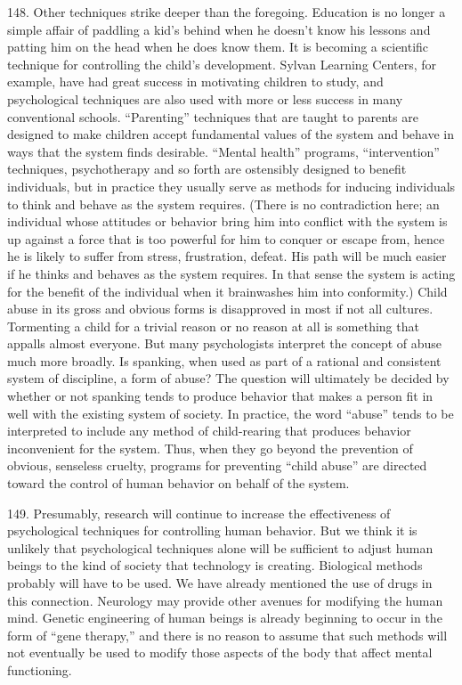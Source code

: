 \documentclass{article}
\begin{document}
148. Other techniques strike deeper than the foregoing. Education is no longer a simple affair of 
paddling a kid’s behind when he doesn’t know his lessons and patting him on the head when he 
does know them. It is becoming a scientific technique for controlling the child’s 
development. Sylvan Learning Centers, for example, have had great success in motivating 
children to study, and psychological techniques are also used with more or less success in many 
conventional schools. “Parenting” techniques that are taught to parents are designed to make 
children accept fundamental values of the system and behave in ways that the system finds 
desirable. “Mental health” programs, “intervention” techniques, psychotherapy and so forth are 
ostensibly designed to benefit individuals, but in practice they usually serve as methods for 
inducing individuals to think and behave as the system requires. (There is no contradiction here; 
an individual whose attitudes or behavior bring him into conflict with the system is up against a 
force that is too powerful for him to conquer or escape from, hence he is likely to suffer from 
stress, frustration, defeat. His path will be much easier if he thinks and behaves as the system 
requires. In that sense the system is acting for the benefit of the individual when it brainwashes 
him into conformity.) Child abuse in its gross and obvious forms is disapproved in most if not all 
cultures. Tormenting a child for a trivial reason or no reason at all is something that appalls almost 
everyone. But many psychologists interpret the concept of abuse much more broadly. Is spanking, 
when used as part of a rational and consistent system of discipline, a form of abuse? The question 
will ultimately be decided by whether or not spanking tends to produce behavior that makes a 
person fit in well with the existing system of society. In practice, the word “abuse” tends to be 
interpreted to include any method of child-rearing that produces behavior inconvenient for the 
system. Thus, when they go beyond the prevention of obvious, senseless cruelty, programs for 
preventing “child abuse” are directed toward the control of human behavior on behalf of the 
system. \vspace{\baselineskip}
 
149. Presumably, research will continue to increase the effectiveness of psychological techniques 
for controlling human behavior. But we think it is unlikely that psychological techniques alone 
will be sufficient to adjust human beings to the kind of society that technology is 
creating. Biological methods probably will have to be used. We have already mentioned the use 
of drugs in this connection. Neurology may provide other avenues for modifying the human 
mind. Genetic engineering of human beings is already beginning to occur in the form of “gene 
therapy,” and there is no reason to assume that such methods will not eventually be used to modify 
those aspects of the body that affect mental functioning. \vspace{\baselineskip}
\end{document}
